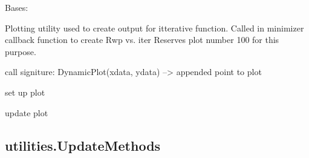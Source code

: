 \documentclass[letterpaper,10pt,english]{sphinxmanual}
\begin{document}
\begin{fulllineitems}
Bases: 

Plotting utility used to create output for itterative function.
Called in minimizer callback function to create Rwp  vs.  iter
Reserves plot number 100 for this purpose.

call signiture: DynamicPlot(xdata, ydata) --\textgreater{} appended point to plot

\begin{fulllineitems}
\end{fulllineitems}


\begin{fulllineitems}
set up plot

\end{fulllineitems}


\begin{fulllineitems}
update plot

\end{fulllineitems}


\end{fulllineitems}



\subsection{utilities.UpdateMethods}
\label{\detokenize{rst/utilities:utilities-updatemethods}}
\end{document}
